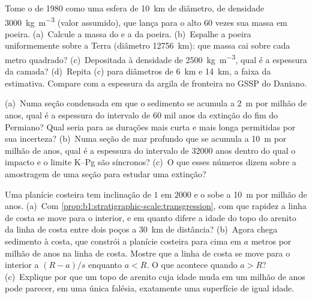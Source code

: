 \begin{exercise}[$\star\star$]\label{exo:b1:stratigraphic-scale:8}
Tome o  de 1980 como uma esfera de \qty{10}{km} de diâmetro, de densidade
\qty{3000}{kg.m^{-3}} (valor assumido), que lança para o alto 60 vezes sua massa em poeira.
(a)~Calcule a massa do  e a da poeira. (b)~Espalhe a poeira uniformemente sobre a Terra
(diâmetro \qty{12756}{km}): que massa cai sobre cada metro quadrado? (c)~Depositada à densidade
de \qty{2500}{kg.m^{-3}}, qual é a espessura da camada? (d)~Repita (c) para diâmetros de
\qty{6}{km} e \qty{14}{km}, a faixa da estimativa. Compare com a espessura da argila de fronteira
no GSSP do Daniano.
\end{exercise}

\begin{exercise}[$\star\star$]\label{exo:b1:stratigraphic-scale:9}
(a)~Numa seção condensada em que o sedimento se acumula a \qty{2}{m} por milhão de anos, qual
é a espessura do intervalo de \num{60} mil anos da extinção do fim do Permiano? Qual seria para
as durações mais curta e mais longa permitidas por sua incerteza? (b)~Numa seção de mar profundo
que se acumula a \qty{10}{m} por milhão de anos, qual é a espessura do intervalo de \num{32000}
anos dentro do qual o impacto e o limite K--Pg são síncronos? (c)~O que esses números dizem
sobre a amostragem de uma seção para estudar uma extinção?
\end{exercise}

\begin{exercise}[$\star\star\star$]\label{exo:b1:stratigraphic-scale:10}
Uma planície costeira tem inclinação de $1$ em $2000$ e o  sobe a
\qty{10}{m} por milhão de anos. (a)~Com \cref{prop:b1:stratigraphic-scale:transgression}, com
que rapidez a linha de costa se move para o interior, e em quanto difere a idade do topo do
arenito da linha de costa entre dois poços a \qty{30}{km} de distância? (b)~Agora chega sedimento
à costa, que constrói a planície costeira para cima em $a$ metros por milhão de anos na linha de
costa. Mostre que a linha de costa se move para o interior a $(R - a)/s$ enquanto $a < R$. O que
acontece quando $a > R$? (c)~Explique por que um topo de arenito cuja idade muda em um milhão de
anos pode parecer, em uma única falésia, exatamente uma superfície de igual idade.
\end{exercise}


